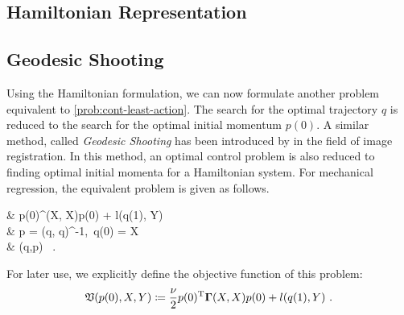 

\subsection{Hamiltonian Representation}



\subsection{Geodesic Shooting}

Using the Hamiltonian formulation, we can now formulate another problem equivalent to \cref{prob:cont-least-action}.
The search for the optimal trajectory $q$ is reduced to the search for the optimal initial momentum $p(0)$.
A similar method, called \emph{Geodesic Shooting} has been introduced by \citet{allassonniere05} in the field of image registration.
In this method, an optimal control problem is also reduced to finding optimal initial momenta for a Hamiltonian system.
For mechanical regression, the equivalent problem is given as follows.
\begin{problem}
	\label{prob:geodesic-shooting}
	\begin{cases}
		&  p(0)^\T \bGamma(X, X)p(0) + l(q(1), Y)\\
		 & p = \bGamma(q, q)^{-1},\ q(0) = X \\
		& (q,p)  \ .
	\end{cases}
\end{problem}
For later use, we explicitly define the objective function of this problem:
\begin{equation}
\label{eq:geodesic-shooting-objective}
\mathfrak{V}(p(0), X, Y) \coloneqq \frac{\nu}{2} p(0)^{\mathrm{T}} \mathbf{\Gamma}(X, X)p(0) + l(q(1), Y) \ .
\end{equation}

